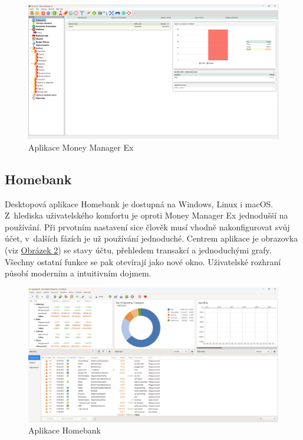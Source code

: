 \documentclass[
  biblatex,
  figures=true,
  tables=false,
  glossaries,
  index
]{kidiplom}
\begin{document}
\begin{figure}
  \centering
  \includegraphics[width=1\textwidth]{images/manager-ex.png}
  \caption{Aplikace Money Manager Ex}
  \label{fig:money-manager}
\end{figure}

\subsection{Homebank}
Desktopová aplikace Homebank \cite{homebank} je dostupná na Windows, Linux i macOS. Z~hlediska uživatelského komfortu je oproti Money Manager Ex jednodušší na používání. Při prvotním nastavení sice člověk musí vhodně nakonfigurovat svůj účet, v~dalších fázích je už používání jednoduché. Centrem aplikace je obrazovka (viz \hyperref[fig:homebank]{Obrázek \ref{fig:homebank}}) se stavy účtu, přehledem transakcí a jednoduchými grafy. Všechny ostatní funkce se pak otevírají jako nové okno. Uživatelské rozhraní působí moderním a intuitivním dojmem.\newline

\begin{figure}
  \centering
  \includegraphics[width=1\textwidth]{images/homebank.png}
  \caption{Aplikace Homebank}
  \label{fig:homebank}
\end{figure}
\end{document}
